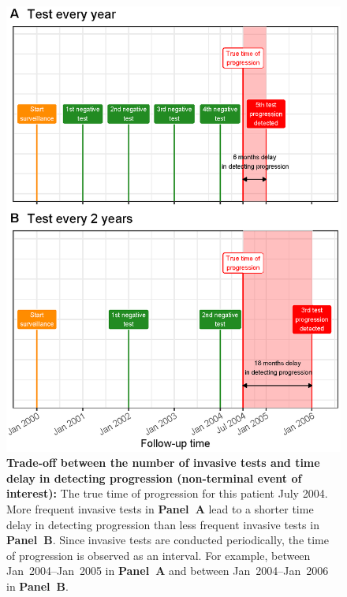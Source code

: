 \begin{figure}
\centerline{\includegraphics{images/delay_explanation.eps}}
\caption{\textbf{Trade-off between the number of invasive tests and time delay in detecting progression (non-terminal event of interest):} The true time of progression for this patient July 2004. More frequent invasive tests in \textbf{Panel~A} lead to a shorter time delay in detecting progression than less frequent invasive tests in \textbf{Panel~B}. Since invasive tests are conducted periodically, the time of progression is observed as an interval. For example, between Jan~2004--Jan~2005 in \textbf{Panel~A} and between Jan~2004--Jan~2006 in \textbf{Panel~B}.} 
\label{fig:delay_explanation}
\end{figure}

